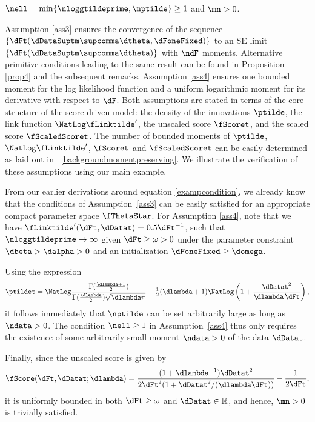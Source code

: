 \begin{ass}
\label{ass4}
$\nell = \min \{ \nloggtildeprime, \nptilde\} \geq 1$ and $\mn>0$.
\end{ass}

Assumption \ref{ass3}  ensures the convergence of the  sequence $\{\dFt(\dDataSuptm\supcomma\dtheta,\dFoneFixed)\}$ to an SE limit $\{\dFt(\dDataSuptm\supcomma\dtheta)\}$ with $\ndF$ moments. Alternative primitive conditions leading to the same result can be found in Proposition \ref{prop4} and the subsequent remarks.  Assumption \ref{ass4} ensures one bounded moment for the log likelihood function and a uniform logarithmic moment for its derivative with respect to $\dF$. Both assumptions are stated in terms of the core structure of the score-driven model: the density of the innovations $\ptilde$, the link function $\NatLog\fLinktilde'$, the unscaled score $\fScoret$, and the scaled score $\fScaledScoret$. 
The number of bounded moments of $\ptilde$, $\NatLog\fLinktilde'$,  $\fScoret$ and $\fScaledScoret$ can be easily determined as laid out in \SupplementaryAppendix~\ref{backgroundmomentpreserving}.
We illustrate the verification of these assumptions using our main example.

\begin{exmc} %
From our earlier derivations around equation \eqref{exampcondition}, we already know that the conditions of Assumption~\ref{ass3} can be easily satisfied for an appropriate compact parameter space $\fThetaStar$.
For Assumption \ref{ass4}, note that we have $\fLinktilde'(\dFt,\dDatat) = 0.5\dFt^{-1}$, such that $\nloggtildeprime\to\infty$ given $\dFt \geq \omega > 0$ under the parameter constraint  $\dbeta>\dalpha>0$ and an initialization $\dFoneFixed\geq\domega$. 

Using the expression 
\[
	\ptildet = 
	\NatLog \frac{\Gamma(\frac{\dlambda+1}{2})}{\Gamma(\frac{\dlambda}{2})\sqrt{\dlambda\pi}}
	- \tfrac12(\dlambda+1)
	\NatLog\left(1 + \frac{\dDatat^2}{\dlambda \, \dFt}\right),
\]
it follows immediately that $\nptilde$ can be set arbitrarily large as long as $\ndata>0$. 
The condition $\nell\geq 1$ in Assumption~\ref{ass4} thus only requires the existence of some arbitrarily small moment $\ndata>0$ of the data $\dDatat$.

Finally, since the unscaled score is given by
\begin{equation*}
	\fScore(\dFt,\dDatat;\dlambda)  = 
	\frac{(1+\dlambda^{-1})\dDatat^2}
	{2\dFt^{2}(1+ \dDatat^2/(\dlambda\dFt))} - \frac{1}{2\dFt},
\end{equation*}
it is uniformly bounded in both $\dFt \geq \omega$ and $\dDatat \in \mathbb{R}$, and hence,  $\mn>0$ is trivially satisfied.   

\end{exmc}



